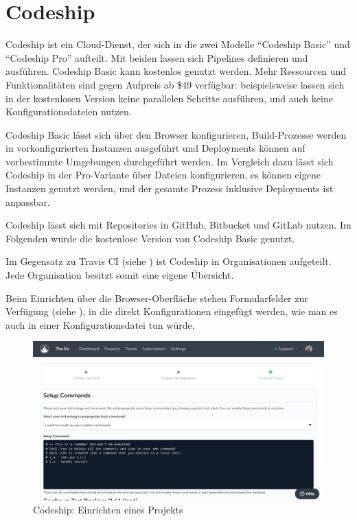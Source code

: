 \section{Codeship}
\label{sec:analyse-codeship}

Codeship ist ein Cloud-Dienst, der sich in die zwei Modelle ``Codeship Basic'' und ``Codeship Pro'' aufteilt. Mit beiden lassen sich Pipelines definieren und ausführen. Codeship Basic kann kostenlos genutzt werden. Mehr Ressourcen und Funktionalitäten sind gegen Aufpreis ab \$49 verfügbar: beispielsweise lassen sich in der kostenlosen Version keine parallelen Schritte ausführen, und auch keine Konfigurationsdateien nutzen.

Codeship Basic lässt sich über den Browser konfigurieren, Build-Prozesse werden in vorkonfigurierten Instanzen ausgeführt und Deployments können auf vorbestimmte Umgebungen durchgeführt werden. Im Vergleich dazu lässt sich Codeship in der Pro-Variante über Dateien konfigurieren, es können eigene Instanzen genutzt werden, und der gesamte Prozess inklusive Deployments ist anpassbar.

Codeship lässt sich mit Repositories in GitHub, Bitbucket und GitLab nutzen. Im Folgenden wurde die kostenlose Version von Codeship Basic genutzt.

Im Gegensatz zu Travis CI (siehe ) ist Codeship in Organisationen aufgeteilt. Jede Organisation besitzt somit eine eigene Übersicht.

Beim Einrichten über die Browser-Oberfläche stehen Formularfelder zur Verfügung (siehe ), in die direkt Konfigurationen eingefügt werden, wie man es auch in einer Konfigurationsdatei tun würde.

\begin{figure}[h]
  \caption{Codeship: Einrichten eines Projekts}
  \label{fig:codeship-setup}
  \includegraphics[width=.8\textwidth]{assets/codeship-setup}
\end{figure}

